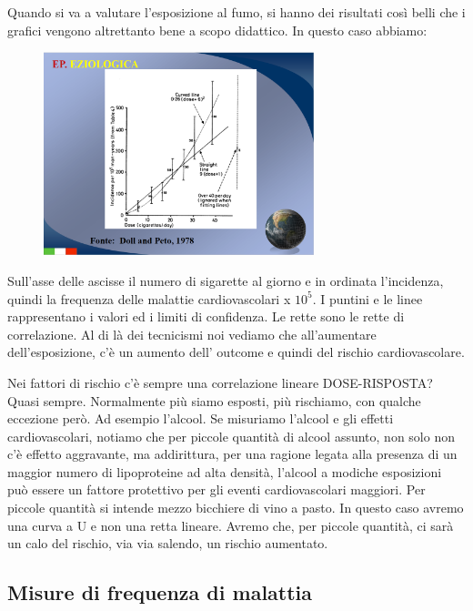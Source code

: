 Quando si va a valutare l'esposizione al fumo, si hanno dei risultati
così belli che i grafici vengono altrettanto bene a scopo didattico. In
questo caso abbiamo:

\begin{figure}[!ht]
\centering
	\includegraphics[width=0.7\textwidth]{03/image2.png}
\end{figure}

Sull'asse delle ascisse il numero di sigarette al giorno e in ordinata
l'incidenza, quindi la frequenza delle malattie cardiovascolari x $10^5$. I
puntini e le linee rappresentano i valori ed i limiti di confidenza. Le
rette sono le rette di correlazione. Al di là dei tecnicismi noi vediamo
che all'aumentare dell'esposizione, c'è un aumento dell' outcome e
quindi del rischio cardiovascolare.

Nei fattori di rischio c'è sempre una correlazione lineare
DOSE-RISPOSTA? Quasi sempre. Normalmente più siamo esposti, più
rischiamo, con qualche eccezione però. Ad esempio l'alcool. Se misuriamo
l'alcool e gli effetti cardiovascolari, notiamo che per piccole quantità
di alcool assunto, non solo non c'è effetto aggravante, ma addirittura,
per una ragione legata alla presenza di un maggior numero di
lipoproteine ad alta densità, l'alcool a modiche esposizioni può essere
un fattore protettivo per gli eventi cardiovascolari maggiori. Per
piccole quantità si intende mezzo bicchiere di vino a pasto. In questo
caso avremo una curva a U e non una retta lineare. Avremo che, per
piccole quantità, ci sarà un calo del rischio, via via salendo, un
rischio aumentato.

\subsection{Misure di frequenza di malattia}


